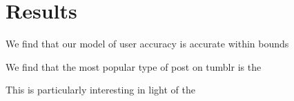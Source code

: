 \section{Results}
\label{sec:-res}
We find that our model of user accuracy is accurate within bounds

We find that the most popular type of post on tumblr is the

This is particularly interesting in light of the 

